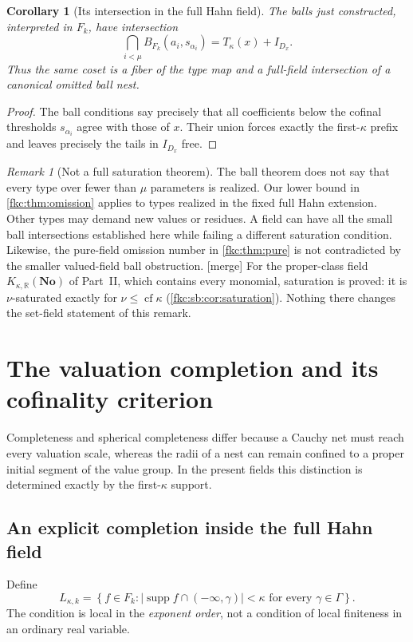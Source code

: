 \documentclass[11pt,letterpaper]{article}
\numberwithin{equation}{section}
\newtheorem{corollary}[theorem]{Corollary}
\theoremstyle{definition}
\theoremstyle{remark}
\newtheorem{remark}[theorem]{Remark}
\newcommand{\R}{\mathbb R}
\newcommand{\No}{\mathbf{No}}
\newcommand{\supp}{\operatorname{supp}}
\newcommand{\cf}{\operatorname{cf}}
\newcommand{\mergetag}{\textup{\textsf{\small[merge]}}}%
\newcommand{\KN}[2]{K_{#1,#2}(\No)}%
\begin{document}
\begin{corollary}[Its intersection in the full Hahn field]\label{fkc:cor:ballfiber}
The balls just constructed, interpreted in $F_k$, have intersection
\[
 \bigcap_{i<\mu}B_{F_k}(a_i,s_{\alpha_i})
   =T_\kappa(x)+I_{D_x}.
\]
Thus the same coset is a fiber of the type map and a full-field intersection of a canonical omitted ball nest.
\end{corollary}
\begin{proof}
The ball conditions say precisely that all coefficients below the cofinal thresholds $s_{\alpha_i}$ agree with those of $x$. Their union forces exactly the first-$\kappa$ prefix and leaves precisely the tails in $I_{D_x}$ free.
\end{proof}

\begin{remark}[Not a full saturation theorem]
The ball theorem does not say that every type over fewer than $\mu$ parameters is realized. Our lower bound in \cref{fkc:thm:omission} applies to types realized in the fixed full Hahn extension. Other types may demand new values or residues. A field can have all the small ball intersections established here while failing a different saturation condition. Likewise, the pure-field omission number in \cref{fkc:thm:pure} is not contradicted by the smaller valued-field ball obstruction. \mergetag{} For the proper-class field $\KN\kappa\R$ of Part~II, which contains every monomial, saturation is proved: it is $\nu$-saturated exactly for $\nu\le\cf\kappa$ (\cref{fkc:sb:cor:saturation}). Nothing there changes the set-field statement of this remark.
\end{remark}

\section{The valuation completion and its cofinality criterion}
\label{fkc:sec:completion}

Completeness and spherical completeness differ because a Cauchy net must reach every valuation scale, whereas the radii of a nest can remain confined to a proper initial segment of the value group. In the present fields this distinction is determined exactly by the first-$\kappa$ support.

\subsection{An explicit completion inside the full Hahn field}
Define
\begin{equation}\label{fkc:eq:localfield}
 L_{\kappa,k}=\left\{f\in F_k:
 |\supp f\cap(-\infty,\gamma)|<\kappa
 \text{ for every }\gamma\in\Gamma\right\}.
\end{equation}
The condition is local in the \emph{exponent order}, not a condition of local finiteness in an ordinary real variable.
\end{document}

